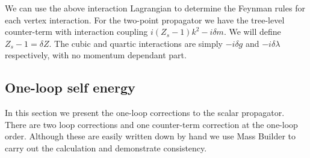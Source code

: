 \documentclass[11pt]{article}
\newcommand{\mb}{\textsf{Mass Builder} \! }
\begin{document}
We can use the above interaction Lagrangian to determine the Feynman rules for each vertex interaction.  For the two-point propagator we have the tree-level counter-term with interaction coupling $i(Z_s-1)k^2-i\delta m$.  We will define $Z_s-1=\delta Z$.  The cubic and quartic interactions are simply $-i\delta g$ and $-i\delta \lambda$ respectively, with no momentum dependant part.





\subsection{One-loop self energy}

In this section we present the one-loop corrections to the scalar propagator.  There are two loop corrections and one counter-term correction at the one-loop order.  Although these are easily written down by hand we use \mb to carry out the calculation and demonstrate consistency.
\end{document}
